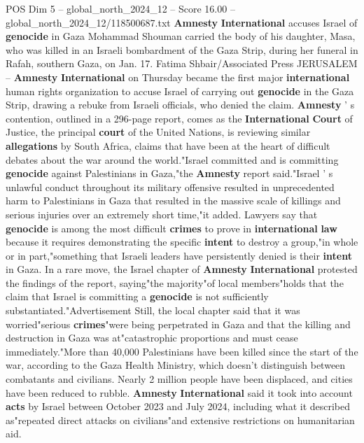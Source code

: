 \begin{textsample}{POS Dim 5 – global\_north\_2024\_12 – Score 16.00 – global\_north\_2024\_12/118500687.txt}  \label{ex:f5_pos_129}
\textbf{Amnesty} \textbf{International} accuses Israel of \textbf{genocide} in Gaza Mohammad Shouman carried the body of his daughter, Masa, who was killed in an Israeli bombardment of the Gaza Strip, during her funeral in Rafah, southern Gaza, on Jan. 17.
Fatima Shbair/Associated Press JERUSALEM -- \textbf{Amnesty} \textbf{International} on Thursday became the first major \textbf{international} human rights organization to accuse Israel of carrying out \textbf{genocide} in the Gaza Strip, drawing a rebuke from Israeli officials, who denied the claim. \textbf{Amnesty} ' s contention, outlined in a 296-page report, comes as the \textbf{International} \textbf{Court} of Justice, the principal \textbf{court} of the United Nations, is reviewing similar \textbf{allegations} by South Africa, claims that have been at the heart of difficult debates about the war around the world."Israel committed and is committing \textbf{genocide} against Palestinians in Gaza,"the \textbf{Amnesty} report said."Israel ' s unlawful conduct throughout its military offensive resulted in unprecedented harm to Palestinians in Gaza that resulted in the massive scale of killings and serious injuries over an extremely short time,"it added.
Lawyers say that \textbf{genocide} is among the most difficult \textbf{crimes} to prove in \textbf{international} \textbf{law} because it requires demonstrating the specific \textbf{intent} to destroy a group,"in whole or in part,"something that Israeli leaders have persistently denied is their \textbf{intent} in Gaza.
In a rare move, the Israel chapter of \textbf{Amnesty} \textbf{International} protested the findings of the report, saying"the majority"of local members"holds that the claim that Israel is committing a \textbf{genocide} is not sufficiently substantiated."Advertisement Still, the local chapter said that it was worried"serious \textbf{crimes}"were being perpetrated in Gaza and that the killing and destruction in Gaza was at"catastrophic proportions and must cease immediately."More than 40,000 Palestinians have been killed since the start of the war, according to the Gaza Health Ministry, which doesn't distinguish between combatants and civilians.
Nearly 2 million people have been displaced, and cities have been reduced to rubble. \textbf{Amnesty} \textbf{International} said it took into account \textbf{acts} by Israel between October 2023 and July 2024, including what it described as"repeated direct attacks on civilians"and extensive restrictions on humanitarian aid.

\end{textsample}
